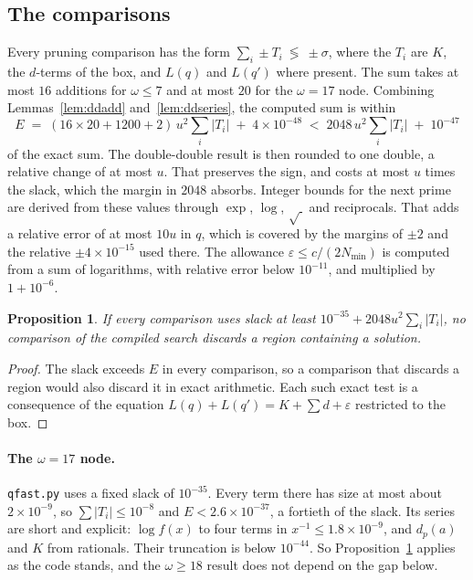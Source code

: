 \documentclass[11pt]{amsart}
\newtheorem{proposition}[theorem]{Proposition}
\theoremstyle{remark}
\begin{document}
\subsection{The comparisons}
Every pruning comparison has the form $\sum_i \pm T_i \ \lessgtr\ \pm\sigma$, where
the $T_i$ are $K$, the $d$-terms of the box, and $L(q)$ and $L(q')$ where present.
The sum takes at most $16$ additions for $\omega \le 7$ and at most $20$ for the
$\omega = 17$ node. Combining Lemmas~\ref{lem:ddadd} and~\ref{lem:ddseries}, the
computed sum is within
\[
  E \;=\; (16 \times 20 + 1200 + 2)\,u^{2} \sum_i |T_i| \;+\; 4 \times 10^{-48}
  \;<\; 2048\,u^{2} \sum_i |T_i| \;+\; 10^{-47}
\]
of the exact sum. The double-double result is then rounded to one double, a
relative change of at most $u$. That preserves the sign, and costs at most $u$
times the slack, which the margin in $2048$ absorbs. Integer bounds for the next
prime are derived from these values through $\exp$, $\log$, $\sqrt{\ }$ and
reciprocals. That adds a relative error of at most $10u$ in $q$, which is covered
by the margins of $\pm 2$ and the relative $\pm 4 \times 10^{-15}$ used there.
The allowance $\varepsilon \le c/(2N_{\min})$ is computed from a sum of logarithms,
with relative error below $10^{-11}$, and multiplied by $1 + 10^{-6}$.

\begin{proposition}\label{prop:fpsound}
If every comparison uses slack at least $10^{-35} + 2048u^{2} \sum_i |T_i|$, no
comparison of the compiled search discards a region containing a solution.
\end{proposition}
\begin{proof}
The slack exceeds $E$ in every comparison, so a comparison that discards a region
would also discard it in exact arithmetic. Each such exact test is a consequence
of the equation $L(q) + L(q') = K + \sum d + \varepsilon$ restricted to the box.
\end{proof}

\paragraph{The $\omega = 17$ node.} \texttt{qfast.py} uses a fixed slack of
$10^{-35}$. Every term there has size at most about $2 \times 10^{-9}$, so
$\sum |T_i| \le 10^{-8}$ and $E < 2.6 \times 10^{-37}$, a fortieth of the slack.
Its series are short and explicit: $\log f(x)$ to four terms in
$x^{-1} \le 1.8 \times 10^{-9}$, and $d_p(a)$ and $K$ from rationals. Their
truncation is below $10^{-44}$. So Proposition~\ref{prop:fpsound} applies as the
code stands, and the $\omega \ge 18$ result does not depend on the gap below.
\end{document}
